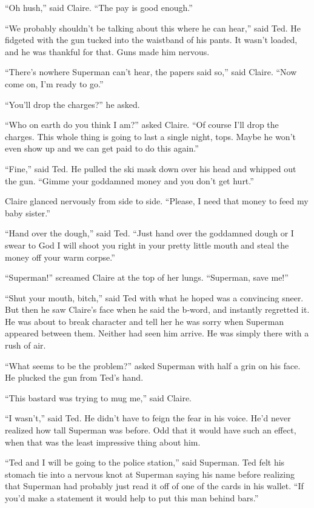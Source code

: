 \documentclass[ebook,12pt]{memoir}
\begin{document}
``Oh hush,'' said Claire. ``The pay is good enough.''

``We probably shouldn't be talking about this where he can hear,'' said
Ted. He fidgeted with the gun tucked into the waistband of his pants. It
wasn't loaded, and he was thankful for that. Guns made him nervous.

``There's nowhere Superman can't hear, the papers said so,'' said
Claire. ``Now come on, I'm ready to go.''

``You'll drop the charges?'' he asked.

``Who on earth do you think I am?'' asked Claire. ``Of course I'll drop
the charges. This whole thing is going to last a single night, tops.
Maybe he won't even show up and we can get paid to do this again.''

``Fine,'' said Ted. He pulled the ski mask down over his head and
whipped out the gun. ``Gimme your goddamned money and you don't get
hurt.''

Claire glanced nervously from side to side. ``Please, I need that money
to feed my baby sister.''

``Hand over the dough,'' said Ted. ``Just hand over the goddamned dough
or I swear to God I will shoot you right in your pretty little mouth and
steal the money off your warm corpse.''

``Superman!'' screamed Claire at the top of her lungs. ``Superman, save
me!''

``Shut your mouth, bitch,'' said Ted with what he hoped was a convincing
sneer. But then he saw Claire's face when he said the b‐word, and
instantly regretted it. He was about to break character and tell her he
was sorry when Superman appeared between them. Neither had seen him
arrive. He was simply there with a rush of air.

``What seems to be the problem?'' asked Superman with half a grin on his
face. He plucked the gun from Ted's hand.

``This bastard was trying to mug me,'' said Claire.

``I wasn't,'' said Ted. He didn't have to feign the fear in his voice.
He'd never realized how tall Superman was before. Odd that it would have
such an effect, when that was the least impressive thing about him.

``Ted and I will be going to the police station,'' said Superman. Ted
felt his stomach tie into a nervous knot at Superman saying his name
before realizing that Superman had probably just read it off of one of
the cards in his wallet. ``If you'd make a statement it would help to
put this man behind bars.''
\end{document}

